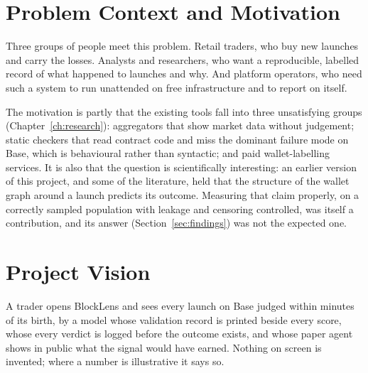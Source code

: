 \section{Problem Context and Motivation}
Three groups of people meet this problem. Retail traders, who buy new launches and carry the losses. Analysts and researchers, who want a reproducible, labelled record of what happened to launches and why. And platform operators, who need such a system to run unattended on free infrastructure and to report on itself.

The motivation is partly that the existing tools fall into three unsatisfying groups (Chapter~\ref{ch:research}): aggregators that show market data without judgement; static checkers that read contract code and miss the dominant failure mode on Base, which is behavioural rather than syntactic; and paid wallet-labelling services. It is also that the question is scientifically interesting: an earlier version of this project, and some of the literature, held that the structure of the wallet graph around a launch predicts its outcome. Measuring that claim properly, on a correctly sampled population with leakage and censoring controlled, was itself a contribution, and its answer (Section~\ref{sec:findings}) was not the expected one.

\section{Project Vision}
A trader opens BlockLens and sees every launch on Base judged within minutes of its birth, by a model whose validation record is printed beside every score, whose every verdict is logged before the outcome exists, and whose paper agent shows in public what the signal would have earned. Nothing on screen is invented; where a number is illustrative it says so.

